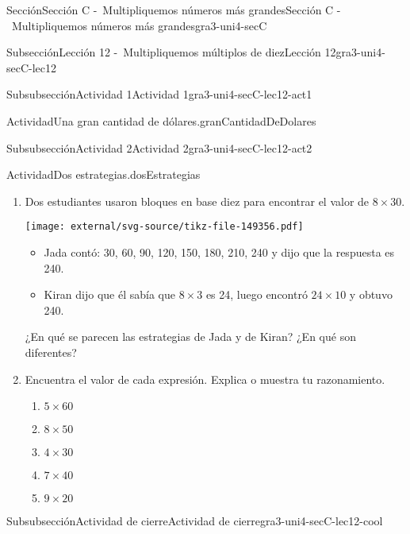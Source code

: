 \documentclass[twoside,14pt,]{extarticle}
\begin{document}
\begin{sectionptx}{Sección}{Sección C -~Multipliquemos números más grandes}{}{Sección C -~Multipliquemos números más grandes}{}{}{gra3-uni4-secC}
\begin{subsectionptx}{Subsección}{Lección 12 -~Multipliquemos múltiplos de diez}{}{Lección 12}{}{}{gra3-uni4-secC-lec12}
\begin{subsubsectionptx}{Subsubsección}{Actividad 1}{}{Actividad 1}{}{}{gra3-uni4-secC-lec12-act1}
\begin{activity}{Actividad}{Una gran cantidad de dólares.}{granCantidadDeDolares}
\begin{enumerate}
\begin{center}
{}%
\end{center}%
\end{enumerate}
\end{activity}%
\end{subsubsectionptx}
%
%
\typeout{************************************************}
\typeout{************************************************}
%
\begin{subsubsectionptx}{Subsubsección}{Actividad 2}{}{Actividad 2}{}{}{gra3-uni4-secC-lec12-act2}
\begin{activity}{Actividad}{Dos estrategias.}{dosEstrategias}%
%
\begin{enumerate}
\item{}Dos estudiantes usaron bloques en base diez para encontrar el valor de \(8\times 30\).%
\begin{image}{0}{1}{0}{}%
\texttt{[image: external/svg-source/tikz-file-149356.pdf]}
\end{image}%
%
\begin{itemize}[label=\textbullet]
\item{}Jada contó: 30, 60, 90, 120, 150, 180, 210, 240 y dijo que la respuesta es 240.%
\item{}Kiran dijo que él sabía que \(8\times 3\) es 24, luego encontró \(24\times 10\) y obtuvo 240.%
\end{itemize}
¿En qué se parecen las estrategias de Jada y de Kiran? ¿En qué son diferentes?%
\item{}Encuentra el valor de cada expresión. Explica o muestra tu razonamiento.%
%
\begin{enumerate}
\item{}\(\displaystyle 5 \times 60\)%
\item{}\(\displaystyle 8 \times 50\)%
\item{}\(\displaystyle 4 \times 30\)%
\item{}\(\displaystyle 7 \times 40\)%
\item{}\(\displaystyle 9 \times 20\)%
\end{enumerate}
\end{enumerate}
\end{activity}%
\end{subsubsectionptx}
%
%
\typeout{************************************************}
\typeout{************************************************}
%
\begin{subsubsectionptx}{Subsubsección}{Actividad de cierre}{}{Actividad de cierre}{}{}{gra3-uni4-secC-lec12-cool}

\end{subsubsectionptx}
\end{subsectionptx}
\end{sectionptx}
\end{document}
